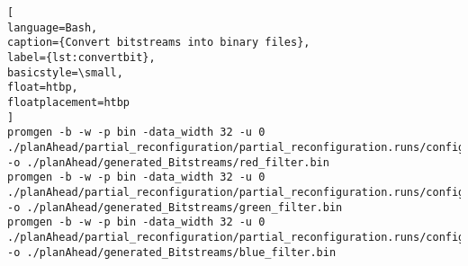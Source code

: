 \begin{lstlisting}[
language=Bash,
caption={Convert bitstreams into binary files},
label={lst:convertbit},
basicstyle=\small,
float=htbp,
floatplacement=htbp
]
promgen -b -w -p bin -data_width 32 -u 0 ./planAhead/partial_reconfiguration/partial_reconfiguration.runs/config_1/config_1_simple_filter_0_simple_filter_0_USER_LOGIC_I_filter_logic_0_red_filter_partial.bit -o ./planAhead/generated_Bitstreams/red_filter.bin
promgen -b -w -p bin -data_width 32 -u 0 ./planAhead/partial_reconfiguration/partial_reconfiguration.runs/config_2/config_2_simple_filter_0_simple_filter_0_USER_LOGIC_I_filter_logic_0_green_filter_partial.bit -o ./planAhead/generated_Bitstreams/green_filter.bin
promgen -b -w -p bin -data_width 32 -u 0 ./planAhead/partial_reconfiguration/partial_reconfiguration.runs/config_3/config_3_simple_filter_0_simple_filter_0_USER_LOGIC_I_filter_logic_0_blue_filter_partial.bit -o ./planAhead/generated_Bitstreams/blue_filter.bin
\end{lstlisting}
